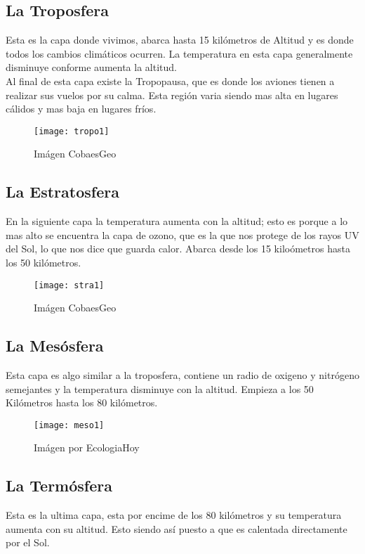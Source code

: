 \documentclass{article}
\begin{document}
\subsection{La Troposfera}
Esta es la capa donde vivimos, abarca hasta 15 kilómetros de Altitud y es donde todos los cambios climáticos ocurren. La temperatura en esta capa generalmente disminuye conforme aumenta la altitud. \\
Al final de esta capa existe la Tropopausa, que es donde los aviones tienen a realizar sus vuelos por su calma. Esta región varia siendo mas alta en lugares cálidos y mas baja en lugares fríos.

\begin{figure}[ht!]
\centering
\texttt{[image: tropo1]}
\caption{Imágen CobaesGeo \label{overflow}}
\end{figure}

\subsection{La Estratosfera}
En la siguiente capa la temperatura aumenta con la altitud; esto es porque a lo mas alto se encuentra la capa de ozono, que es la que nos protege de los rayos UV del Sol, lo que nos dice que guarda calor. Abarca desde los 15 kiloómetros hasta los 50 kilómetros.

\begin{figure}[ht!]
\centering
\texttt{[image: stra1]}
\caption{Imágen CobaesGeo \label{overflow}}
\end{figure}

\subsection{La Mesósfera}
Esta capa es algo similar a la troposfera, contiene un radio de oxigeno y nitrógeno semejantes y la temperatura disminuye con la altitud. Empieza a los 50 Kilómetros hasta los 80 kilómetros.

\begin{figure}[ht!]
\centering
\texttt{[image: meso1]}
\caption{Imágen por EcologiaHoy \label{overflow}}
\end{figure}

\subsection{La Termósfera}
Esta es la ultima capa, esta por encime de los 80 kilómetros y su temperatura aumenta con su altitud. Esto siendo así puesto a que es calentada directamente por el Sol.
\end{document}
